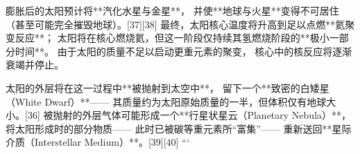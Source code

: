 膨胀后的太阳预计将**汽化水星与金星**，  
并使**地球与火星**变得不可居住（甚至可能完全摧毁地球）。[37][38]  
最终，太阳核心温度将升高到足以点燃**氦聚变反应**；  
太阳将在核心燃烧氦，但这一阶段仅持续其氢燃烧阶段的**极小一部分时间**。  
由于太阳的质量不足以启动更重元素的聚变，  
核心中的核反应将逐渐衰竭并停止。  

太阳的外层将在这一过程中**被抛射到太空中**，  
留下一个**致密的白矮星（White Dwarf）**——  
其质量约为太阳原始质量的一半，但体积仅有地球大小。[36]  
被抛射的外层气体可能形成一个**行星状星云（Planetary Nebula）**，  
将太阳形成时的部分物质——  
此时已被碳等重元素所“富集”——  
重新送回**星际介质（Interstellar Medium）**。[39][40]
```
